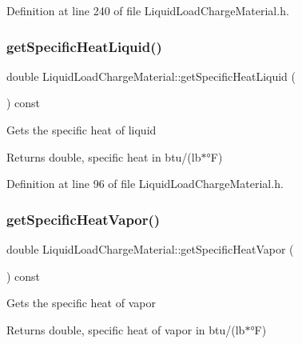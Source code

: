 Definition at line 240 of file Liquid\+Load\+Charge\+Material.\+h.

\mbox{\label{class_liquid_load_charge_material_aa698f1f73dff91951139a4a50582963d}} 
\subsubsection{\texorpdfstring{get\+Specific\+Heat\+Liquid()}{getSpecificHeatLiquid()}}
{\footnotesize\ttfamily double Liquid\+Load\+Charge\+Material\+::get\+Specific\+Heat\+Liquid (\begin{DoxyParamCaption}{ }\end{DoxyParamCaption}) const\hspace{0.3cm}{\ttfamily [inline]}}

Gets the specific heat of liquid \begin{DoxyReturn}{Returns}
double, specific heat in btu/(lb$\ast$°F) 
\end{DoxyReturn}


Definition at line 96 of file Liquid\+Load\+Charge\+Material.\+h.

\mbox{\label{class_liquid_load_charge_material_ac4538f9722bf25465ec86586469a7b1e}} 
\subsubsection{\texorpdfstring{get\+Specific\+Heat\+Vapor()}{getSpecificHeatVapor()}}
{\footnotesize\ttfamily double Liquid\+Load\+Charge\+Material\+::get\+Specific\+Heat\+Vapor (\begin{DoxyParamCaption}{ }\end{DoxyParamCaption}) const\hspace{0.3cm}{\ttfamily [inline]}}

Gets the specific heat of vapor \begin{DoxyReturn}{Returns}
double, specific heat of vapor in btu/(lb$\ast$°F) 
\end{DoxyReturn}



